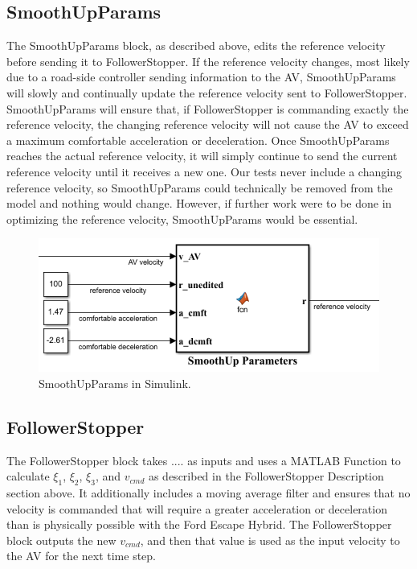 \documentclass[conference]{IEEEtran}
\begin{document}
\subsection{SmoothUpParams}
The SmoothUpParams block, as described above, edits the reference velocity before sending it to FollowerStopper. If the reference velocity changes, most likely due to a road-side controller sending information to the AV, SmoothUpParams will slowly and continually update the reference velocity sent to FollowerStopper. SmoothUpParams will ensure that, if FollowerStopper is commanding exactly the reference velocity, the changing reference velocity will not cause the AV to exceed a maximum comfortable acceleration or deceleration. Once SmoothUpParams reaches the actual reference velocity, it will simply continue to send the current reference velocity until it receives a new one. Our tests never include a changing reference velocity, so SmoothUpParams could technically be removed from the model and nothing would change. However, if further work were to be done in optimizing the reference velocity, SmoothUpParams would be essential.

\begin{figure}[htbp]
\centerline{\includegraphics[width=3.5 in]{smoothupparams.png}}
\caption{SmoothUpParams in Simulink.}
\label{fig2}
\end{figure}

\subsection{FollowerStopper}
The FollowerStopper block takes .... as inputs and uses a MATLAB Function to calculate $\xi_1$, $\xi_2$, $\xi_3$, and $v_{cmd}$ as described in the FollowerStopper Description section above. It additionally includes a moving average filter and ensures that no velocity is commanded that will require a greater acceleration or deceleration than is physically possible with the Ford Escape Hybrid. The FollowerStopper block outputs the new $v_{cmd}$, and then that value is used as the input velocity to the AV for the next time step.
\end{document}
